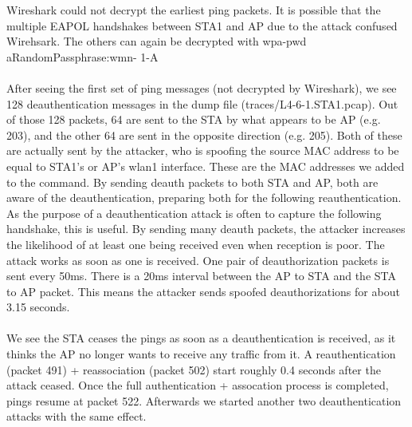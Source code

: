 Wireshark could not decrypt the earliest ping packets. It is possible that the multiple EAPOL handshakes between STA1 and AP due to the attack confused Wirehsark. The others can again be decrypted with wpa-pwd aRandomPassphrase:wmn-
1-A \\ \\

After seeing the first set of ping messages (not decrypted by Wireshark), we see 128 deauthentication messages in the dump file (traces/L4-6-1.STA1.pcap).
Out of those 128 packets, 64 are sent to the STA by what appears to be AP (e.g. 203), and the other 64 are sent in the opposite direction (e.g. 205). Both of these are actually sent by the attacker, who is spoofing the source MAC address to be equal to STA1's or AP's wlan1 interface. These are the MAC addresses we added to the command. By sending deauth packets to both STA and AP, both are aware of the deauthentication, preparing both for the following reauthentication. As the purpose of a deauthentication attack is often to capture the following handshake, this is useful. By sending many deauth packets, the attacker increases the likelihood of at least one being received even when reception is poor. The attack works as soon as one is received. One pair of deauthorization packets is sent every 50ms. There is a 20ms interval between the AP to STA and the STA to AP packet. This means the attacker sends spoofed deauthorizations for about 3.15 seconds. \\ \\
%
We see the STA ceases the pings as soon as a deauthentication is received, as it thinks the AP no longer wants to receive any traffic from it. A reauthentication (packet 491) + reassociation (packet 502) start roughly 0.4 seconds after the attack ceased. Once the full authentication + assocation process is completed, pings resume at packet 522. Afterwards we started another two deauthentication attacks with the same effect. 
%
